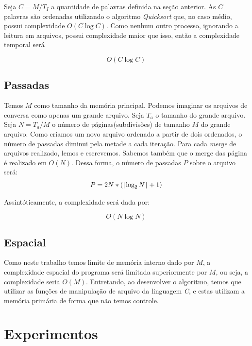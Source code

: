 \documentclass[
	12pt,
	a4paper,
	onepage,
	brazil
]{article}
\DeclarePairedDelimiter\ceil{\lceil}{\rceil}
\begin{document}
	Seja $C=M/T_I$ a quantidade de palavras definida na seção anterior. As $C$ palavras são ordenadas utilizando o algoritmo \textit{Quicksort} que, no caso médio, possui complexidade $O(C\log C)$. Como nenhum outro processo, ignorando a leitura em arquivos, possui complexidade maior que isso, então a complexidade temporal será
	
	\begin{equation}
	O(C\log C)
	\end{equation}
	
	\subsection{Passadas}
	
	Temos $M$ como tamanho da memória principal. Podemos imaginar os arquivos de conversa como apenas um grande arquivo. Seja $T_a$ o tamanho do grande arquivo. Seja $N = T_a/M$ o número de páginas(subdivisões) de tamanho $M$ do grande arquivo. Como criamos um novo arquivo ordenado a partir de dois ordenados, o número de passadas diminui pela metade a cada iteração. Para cada \textit{merge} de arquivos realizado, lemos e escrevemos. Sabemos também que o merge das página é realizado em $O(N)$. Dessa forma, o número de passadas $P$ sobre o arquivo será: 
	\begin{equation}
	P=2N*(\ceil{\log_2 N} + 1)
	\end{equation}
	
	Assintóticamente, a complexidade será dada por:
	
	\begin{equation}
	O(N\log N)
	\end{equation}

	\subsection{Espacial}
	
	Como neste trabalho temos limite de memória interno dado por $M$, a complexidade espacial do programa será limitada superiormente por $M$, ou seja, a complexidade seria $O(M)$. Entretando, ao desenvolver o algoritmo, temos que utilizar as funções de manipulação de arquivo da linguagem \textit{C}, e estas utilizam a memória primária de forma que não temos controle.
	
	\section{Experimentos}
	
\end{document}
